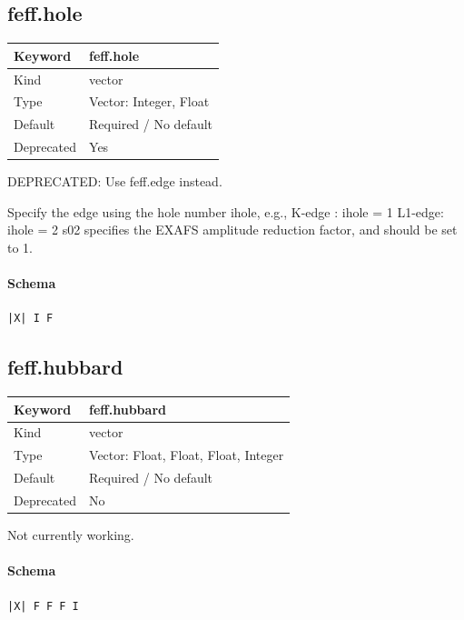 \documentclass[11pt]{article}
\begin{document}
{{{\subsection{feff.hole}
\label{kw:feff-hole}
\begin{longtable}{|p{1.5in}|p{4.5in}|}
\hline
Keyword & feff.hole \\
\hline
Kind & vector \\
\hline
Type & Vector: Integer, Float \\
\hline
Default & Required / No default \\
\hline
Deprecated & Yes \\
\hline
\end{longtable}
 DEPRECATED: Use feff.edge instead.

 Specify the edge using the hole number ihole, e.g.,
 K-edge : ihole = 1
 L1-edge: ihole = 2
 s02 specifies the EXAFS amplitude reduction factor, and should be set to 1.

\paragraph{Schema}
\begin{Verbatim}
|X| I F
\end{Verbatim}

\subsection{feff.hubbard}
\label{kw:feff-hubbard}
\begin{longtable}{|p{1.5in}|p{4.5in}|}
\hline
Keyword & feff.hubbard \\
\hline
Kind & vector \\
\hline
Type & Vector: Float, Float, Float, Integer \\
\hline
Default & Required / No default \\
\hline
Deprecated & No \\
\hline
\end{longtable}
 Not currently working.

\paragraph{Schema}
\begin{Verbatim}
|X| F F F I
\end{Verbatim}

}}}
\end{document}
